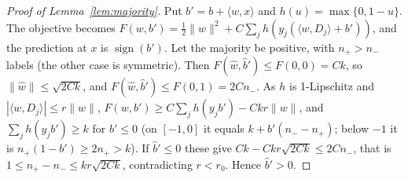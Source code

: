 \documentclass[11pt,a4paper]{article}
\theoremstyle{plain}
\theoremstyle{definition}
\theoremstyle{remark}
\newcommand{\sgn}{\operatorname{sign}}
\begin{document}
\begin{proof}[Proof of Lemma~\ref{lem:majority}]
Put $b'=b+\langle w,x\rangle$ and $h(u)=\max\{0,1-u\}$. The objective becomes $F(w,b')=\tfrac12\|w\|^2+C\sum_j h(y_j(\langle w,D_j\rangle+b'))$, and the prediction at $x$ is $\sgn(b')$. Let the majority be positive, with $n_+>n_-$ labels (the other case is symmetric). Then $F(\hat w,\hat b')\le F(0,0)=Ck$, so $\|\hat w\|\le\sqrt{2Ck}$, and $F(\hat w,\hat b')\le F(0,1)=2Cn_-$. As $h$ is 1-Lipschitz and $|\langle w,D_j\rangle|\le r\|w\|$, $F(w,b')\ge C\sum_jh(y_jb')-Ckr\|w\|$, and $\sum_jh(y_jb')\ge k$ for $b'\le0$ (on $[-1,0]$ it equals $k+b'(n_--n_+)$; below $-1$ it is $n_+(1-b')\ge2n_+>k$). If $\hat b'\le0$ these give $Ck-Ckr\sqrt{2Ck}\le2Cn_-$, that is $1\le n_+-n_-\le kr\sqrt{2Ck}$, contradicting $r<r_0$. Hence $\hat b'>0$.
\end{proof}
\end{document}
